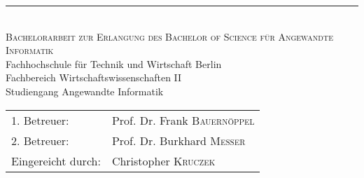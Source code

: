 \begin{titlepage}
	\begin{center} 
		\vspace*{2 cm}
		\textsc{\LARGE \mytitle}
		\rule{\textwidth}{0.4pt} \\[1.5cm]
		\textsc{\Large Bachelorarbeit zur Erlangung des Bachelor of Science f\"ur Angewandte Informatik}\\[1.5cm]
			
			 Fachhochschule für Technik und Wirtschaft Berlin\\
Fachbereich Wirtschaftswissenschaften II\\
Studiengang Angewandte Informatik\\[1cm]			
		\vspace{3cm}
	\end{center}

\begin{center}
\begin{tabular}[h!]{l l}
1. Betreuer: & Prof. Dr. Frank \textsc{Bauern\"oppel}\\
2. Betreuer: & Prof. Dr. Burkhard \textsc{Messer}\\[2cm]
Eingereicht durch: & Christopher \textsc{Kruczek}
\end{tabular}
\end{center}

	\vfill
	\center {\today}
\end{titlepage}